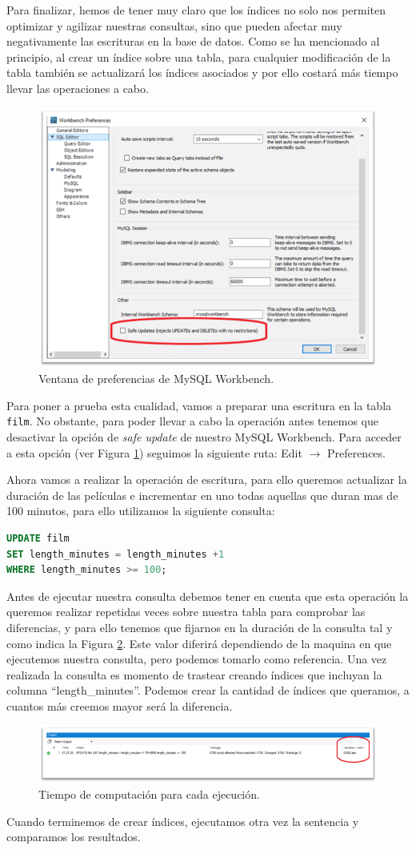 \documentclass{db-practice}
\begin{document}
Para finalizar, hemos de tener muy claro que los índices no solo nos permiten optimizar y agilizar nuestras consultas, sino que pueden afectar muy negativamente las escrituras en la base de datos. Como se ha mencionado al principio, al crear un índice sobre una tabla, para cualquier modificación de la tabla también se actualizará los índices asociados y por ello costará más tiempo llevar las operaciones a cabo.

\begin{figure}[ht]
    \centering
    \includegraphics[width=0.6\columnwidth]{figs/WorkbenchPreferences.png}
    \caption{Ventana de preferencias de MySQL Workbench.}\label{fig:preferences}
\end{figure}

Para poner a prueba esta cualidad, vamos a preparar una escritura en la tabla \texttt{film}. No obstante, para poder llevar a cabo la operación antes tenemos que desactivar la opción de \emph{safe update} de nuestro MySQL Workbench. Para acceder a esta opción (ver Figura \ref{fig:preferences}) seguimos la siguiente ruta: Edit $\rightarrow$ Preferences.

Ahora vamos a realizar la operación de escritura, para ello queremos actualizar la duración de las películas e incrementar en uno todas aquellas que duran mas de 100 minutos, para ello utilizamos la siguiente consulta:

\newpage

\begin{lstlisting}[language=SQL]
UPDATE film
SET length_minutes = length_minutes +1 
WHERE length_minutes >= 100;
\end{lstlisting}

Antes de ejecutar nuestra consulta debemos tener en cuenta que esta operación la queremos realizar repetidas veces sobre nuestra tabla para comprobar las diferencias, y para ello tenemos que fijarnos en la duración de la consulta tal y como indica la Figura \ref{fig:tiempoEjecucion}. Este valor diferirá dependiendo de la maquina en que ejecutemos nuestra consulta, pero podemos tomarlo como referencia. Una vez realizada la consulta es momento de trastear creando índices que incluyan la columna ``length\_minutes''. Podemos crear la cantidad de índices que queramos, a cuantos más creemos mayor será la diferencia. 

\begin{figure}[ht]
    \centering
    \includegraphics[width=0.9\columnwidth]{figs/tiempoEjecucion.png}
    \caption{Tiempo de computación para cada ejecución.}\label{fig:tiempoEjecucion}
\end{figure}

Cuando terminemos de crear índices, ejecutamos otra vez la sentencia y comparamos los resultados.
\end{document}
